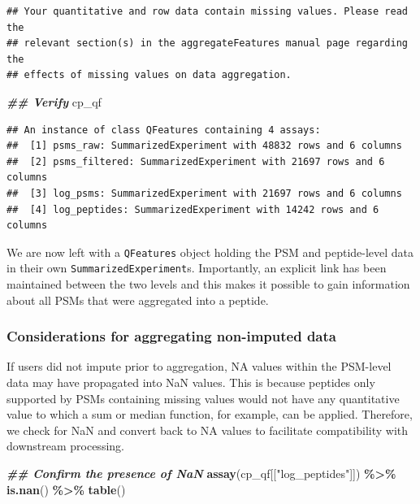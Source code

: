 \documentclass[9pt,a4paper,]{extarticle}
\newenvironment{Shaded}{\begin{snugshade}}{\end{snugshade}}
\newcommand{\DocumentationTok}[1]{\textcolor[rgb]{0.56,0.35,0.01}{\textbf{\textit{#1}}}}
\newcommand{\FunctionTok}[1]{\textcolor[rgb]{0.13,0.29,0.53}{\textbf{#1}}}
\newcommand{\NormalTok}[1]{#1}
\newcommand{\SpecialCharTok}[1]{\textcolor[rgb]{0.81,0.36,0.00}{\textbf{#1}}}
\newcommand{\StringTok}[1]{\textcolor[rgb]{0.31,0.60,0.02}{#1}}
\begin{document}
\begin{verbatim}
## Your quantitative and row data contain missing values. Please read the
## relevant section(s) in the aggregateFeatures manual page regarding the
## effects of missing values on data aggregation.
\end{verbatim}

\begin{Shaded}
\begin{Highlighting}[]
\DocumentationTok{\#\# Verify}
\NormalTok{cp\_qf}
\end{Highlighting}
\end{Shaded}

\begin{verbatim}
## An instance of class QFeatures containing 4 assays:
##  [1] psms_raw: SummarizedExperiment with 48832 rows and 6 columns 
##  [2] psms_filtered: SummarizedExperiment with 21697 rows and 6 columns 
##  [3] log_psms: SummarizedExperiment with 21697 rows and 6 columns 
##  [4] log_peptides: SummarizedExperiment with 14242 rows and 6 columns
\end{verbatim}

We are now left with a \texttt{QFeatures} object holding the PSM and peptide-level data
in their own \texttt{SummarizedExperiment}s. Importantly, an explicit link has been
maintained between the two levels and this makes it possible to gain information
about all PSMs that were aggregated into a peptide.

\hypertarget{considerations-for-aggregating-non-imputed-data}{%
\subsubsection{Considerations for aggregating non-imputed data}\label{considerations-for-aggregating-non-imputed-data}}

If users did not impute prior to aggregation, NA values within the PSM-level
data may have propagated into NaN values. This is because peptides only
supported by PSMs containing missing values would not have any quantitative
value to which a sum or median function, for example, can be applied. Therefore,
we check for NaN and convert back to NA values to facilitate compatibility with
downstream processing.

\begin{Shaded}
\begin{Highlighting}[]
\DocumentationTok{\#\# Confirm the presence of NaN}
\FunctionTok{assay}\NormalTok{(cp\_qf[[}\StringTok{"log\_peptides"}\NormalTok{]]) }\SpecialCharTok{\%\textgreater{}\%}
  \FunctionTok{is.nan}\NormalTok{() }\SpecialCharTok{\%\textgreater{}\%}
  \FunctionTok{table}\NormalTok{()}
\end{Highlighting}
\end{Shaded}
\end{document}
